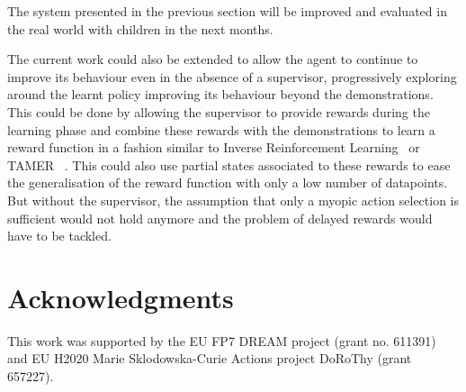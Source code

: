 \documentclass[letterpaper]{article} %
\begin{document}
The system presented in the previous section will be improved and
evaluated in the real world with children in the next months.

The current work could also be extended to allow the agent to continue to
improve its behaviour even in the absence of a supervisor, progressively
exploring around the learnt policy improving its behaviour beyond the
demonstrations. This could be done by allowing the supervisor to provide rewards
during the learning phase and combine these rewards with the demonstrations to
learn a reward function in a fashion similar to Inverse Reinforcement
Learning~\cite{abbeel2004apprenticeship} or TAMER ~\cite{knox2009interactively}.
This could also use partial states associated to these rewards to ease the
generalisation of the reward function with only a low number of datapoints.  But
without the supervisor, the assumption that only a myopic action selection is
sufficient would not hold anymore and the problem of delayed rewards would have
to be tackled.

\section{Acknowledgments} This work was supported by the EU FP7 DREAM project
(grant no.  611391) and EU H2020 Marie Sklodowska-Curie Actions project DoRoThy
(grant 657227).  

 
\end{document}
